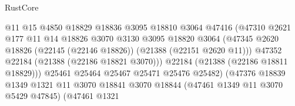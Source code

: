 \begin{lexlean}{RustCore}
\begin{coremodule}
                                              @11
                                              @15
                                              @4850
                                              @18829
                                              @18836
                                              @3095
                                              @18810
                                              @3064
                                              @47416
                                              (@47310
                                                @2621
                                                @177
                                                @11
                                                @14
                                                @18826
                                                @3070
                                                @3130
                                                @3095
                                                @18820
                                                @3064
                                                (@47345
                                                  @2620
                                                  @18826
                                                  (@22145 (@22146 @18826))
                                                  (@21388 (@22151 @2620 @11)))
                                                @47352
                                                @22184
                                                (@21388 (@22186 @18821 @3070)))
                                              @22184
                                              (@21388 (@22186 @18811 @18829)))
                                            @25461
                                            @25464
                                            @25467
                                            @25471
                                            @25476
                                            @25482)
                                          (@47376
                                            @18839
                                            @1349
                                            @1321
                                            @11
                                            @3070
                                            @18841
                                            @3070
                                            @18844
                                            (@47461 @1349 @11 @3070 @5429 @47845)
                                            (@47461
                                              @1321

\end{coremodule}
\end{lexlean}
